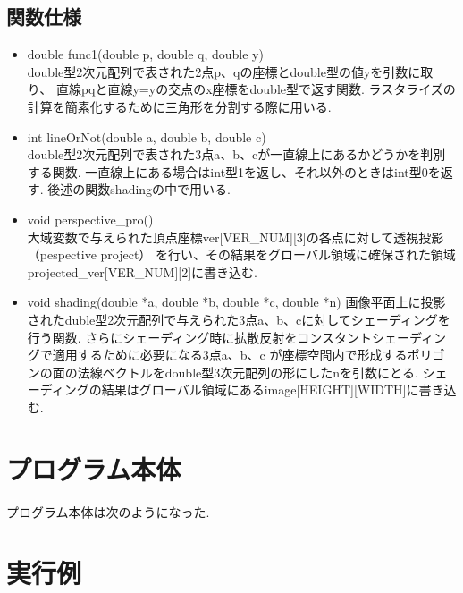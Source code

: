 \documentclass[a4j,dvipdfmx]{jsarticle}
\begin{document}
\subsection{関数仕様}
\begin{itemize}
\item double func1(double \*p, double \*q, double y)\\
  double型2次元配列で表された2点p、qの座標とdouble型の値yを引数に取り、
  直線pqと直線y=yの交点のx座標をdouble型で返す関数.
  ラスタライズの計算を簡素化するために三角形を分割する際に用いる.

\item int lineOrNot(double \*a, double \*b, double \*c)\\
  double型2次元配列で表された3点a、b、cが一直線上にあるかどうかを判別する関数.
  一直線上にある場合はint型1を返し、それ以外のときはint型0を返す.
  後述の関数shadingの中で用いる.

\item void perspective\_pro()\\
  大域変数で与えられた頂点座標ver[VER\_NUM][3]の各点に対して透視投影（pespective project）
  を行い、その結果をグローバル領域に確保された領域projected\_ver[VER\_NUM][2]に書き込む.

\item void shading(double *a, double *b, double *c, double *n)
  画像平面上に投影されたduble型2次元配列で与えられた3点a、b、cに対してシェーディングを行う関数.
  さらにシェーディング時に拡散反射をコンスタントシェーディングで適用するために必要になる3点a、b、c
  が座標空間内で形成するポリゴンの面の法線ベクトルをdouble型3次元配列の形にしたnを引数にとる.
  シェーディングの結果はグローバル領域にあるimage[HEIGHT][WIDTH]に書き込む.
   
\end{itemize}
\section{プログラム本体}
プログラム本体は次のようになった.


\section{実行例}
\end{document}
